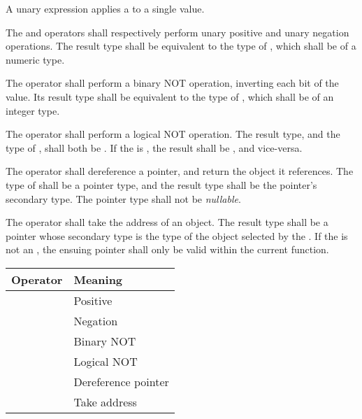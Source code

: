 \specsubsubitem
A unary expression applies a  to a single value.

\specsubsubitem
The \terminal{+} and \terminal{-} operators shall respectively perform unary
positive and unary negation operations. The result type shall be equivalent to
the type of , which shall be of a numeric type.

\specsubsubitem
The \terminal{\textasciitilde} operator shall perform a binary NOT operation,
inverting each bit of the value. Its result type shall be equivalent to the
type of , which shall be of an integer type.

\specsubsubitem
The \terminal{!} operator shall perform a logical NOT operation. The result
type, and the type of , shall both be
. If the  is , the
result shall be , and vice-versa.

\specsubsubitem
The \terminal{*} operator shall dereference a pointer, and return the object it
references.  The type of  shall be a pointer
type, and the result type shall be the pointer's secondary type. The pointer
type shall not be \textit{nullable}.

\specsubsubitem
The \terminal{\&} operator shall take the address of an object. The result type
shall be a pointer whose secondary type is the type of the object selected by
the . If the  is not
an , the ensuing pointer shall only be valid within
the current function.


\begin{tabular}{r | l }
Operator & Meaning \\
\hline
\terminal{+} & Positive \\
\terminal{-} & Negation \\
\terminal{\textasciitilde} & Binary NOT \\
\terminal{!} & Logical NOT \\
\terminal{*} & Dereference pointer \\
\terminal{\&} & Take address \\
\end{tabular}



